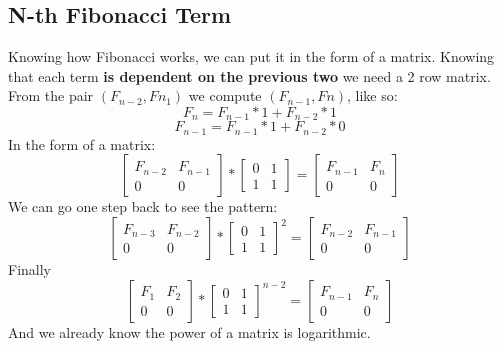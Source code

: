\documentclass{IEEEtran}
\begin{document}
        \subsection{N-th Fibonacci Term}
            Knowing how Fibonacci works, we can put it in the form of a matrix. Knowing that each term \textbf{is dependent on the previous two} we need a 2 row matrix. From the pair $(F_{n-2},F{n_1})$ we compute $(F_{n-1},F{n})$, like so:
            $$F_n=F_{n-1}*1+F_{n-2}*1$$
            $$F_{n-1}=F_{n-1}*1+F_{n-2}*0$$
            In the form of a matrix:
            $$
                \begin{bmatrix}
                    F_{n-2}&F_{n-1}\\
                    0&0
                \end{bmatrix}*
                \begin{bmatrix}
                    0&1\\
                    1&1
                \end{bmatrix}=
                \begin{bmatrix}
                    F_{n-1}&F_{n}\\
                    0&0
                \end{bmatrix}
            $$
            We can go one step back to see the pattern:
            $$
                \begin{bmatrix}
                    F_{n-3}&F_{n-2}\\
                    0&0
                \end{bmatrix}*
                \begin{bmatrix}
                    0&1\\
                    1&1
                \end{bmatrix}^2=
                \begin{bmatrix}
                    F_{n-2}&F_{n-1}\\
                    0&0
                \end{bmatrix}
            $$
            Finally
            $$
                \begin{bmatrix}
                    F_{1}&F_{2}\\
                    0&0
                \end{bmatrix}*
                \begin{bmatrix}
                    0&1\\
                    1&1
                \end{bmatrix}^{n-2}=
                \begin{bmatrix}
                    F_{n-1}&F_{n}\\
                    0&0
                \end{bmatrix}
            $$
            And we already know the power of a matrix is logarithmic.
\end{document}
